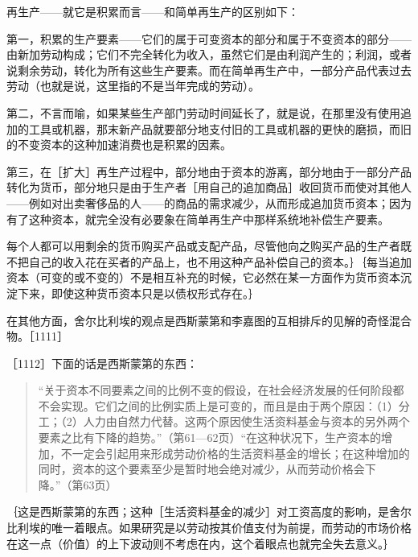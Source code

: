 再生产——就它是积累而言——和简单再生产的区别如下：

第一，积累的生产要素——它们的属于可变资本的部分和属于不变资本的部分——由新加劳动构成；它们不完全转化为收入，虽然它们是由利润产生的；利润，或者说剩余劳动，转化为所有这些生产要素。而在简单再生产中，一部分产品代表过去劳动（也就是说，这里指的不是当年完成的劳动）。

第二，不言而喻，如果某些生产部门劳动时间延长了，就是说，在那里没有使用追加的工具或机器，那末新产品就要部分地支付旧的工具或机器的更快的磨损，而旧的不变资本的这种加速消费也是积累的因素。

第三，在［扩大］再生产过程中，部分地由于资本的游离，部分地由于一部分产品转化为货币，部分地只是由于生产者［用自己的追加商品］收回货币而使对其他人——例如对出卖奢侈品的人——的商品的需求减少，从而形成追加货币资本；因为有了这种资本，就完全没有必要象在简单再生产中那样系统地补偿生产要素。

每个人都可以用剩余的货币购买产品或支配产品，尽管他向之购买产品的生产者既不把自己的收入花在买者的产品上，也不用这种产品补偿自己的资本。｝｛每当追加资本（可变的或不变的）不是相互补充的时候，它必然在某一方面作为货币资本沉淀下来，即使这种货币资本只是以债权形式存在。｝


在其他方面，舍尔比利埃的观点是西斯蒙第和李嘉图的互相排斥的见解的奇怪混合物。［1111］

［1112］下面的话是西斯蒙第的东西：

\begin{quote}{“关于资本不同要素之间的比例不变的假设，在社会经济发展的任何阶段都不会实现。它们之间的比例实质上是可变的，而且是由于两个原因：（1）分工；（2）人力由自然力代替。这两个原因使生活资料基金与资本的另外两个要素之比有下降的趋势。”（第61—62页）“在这种状况下，生产资本的增加，不一定会引起用来形成劳动价格的生活资料基金的增长；在这种增加的同时，资本的这个要素至少是暂时地会绝对减少，从而劳动价格会下降。”（第63页）}\end{quote}

｛这是西斯蒙第的东西；这种［生活资料基金的减少］对工资高度的影响，是舍尔比利埃的唯一着眼点。如果研究是以劳动按其价值支付为前提，而劳动的市场价格在这一点（价值）的上下波动则不考虑在内，这个着眼点也就完全失去意义。｝

